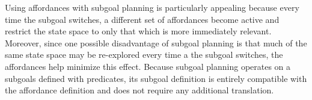 \documentclass[]{article}
\begin{document}

Using affordances with subgoal planning is particularly appealing because
every time the subgoal switches, a different set of affordances become
active and restrict the state space to only that which is
more immediately relevant. Moreover, since one possible disadvantage of subgoal
planning is that much of the same state space may be re-explored
every time a the subgoal switches, the affordances help minimize
this effect. Because subgoal planning operates on a subgoals defined with predicates,
its subgoal definition is entirely compatible with the affordance
definition and does not require any additional translation.

\end{document}
